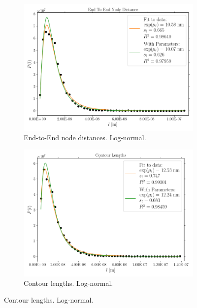 \begin{figure}[H]
\begin{subfigure}{0.5\textwidth}
    \label{subfig:carra_cosines}
  \end{subfigure}\\[1ex]
  \begin{subfigure}{0.5\textwidth}
    \centering
    \includegraphics[width=0.99\linewidth]{Figures/chapter-image/pipeline_screenshots/carra_ete_distance_tile1_c_m_iPA_iShort2_bins50.png}
    \caption{End-to-End node distances. Log-normal.}
    \label{subfig:carra_ete}
  \end{subfigure}%
  \begin{subfigure}{0.5\textwidth}
    \centering
    \includegraphics[width=0.99\linewidth]{Figures/chapter-image/pipeline_screenshots/carra_contour_length_tile1_c_m_iPA_iShort2_bins50.png}
    \caption{Contour lengths. Log-normal.}

\end{subfigure}
\end{figure}
